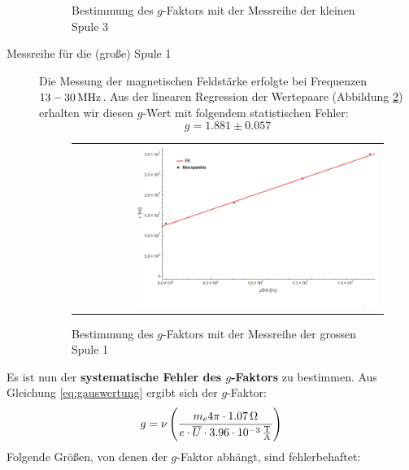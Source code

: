 \documentclass[a4paper,titlepage]{scrartcl}
\numberwithin{equation}{section}
\begin{document}
\begin{description}
\begin{figure}[H]
\begin{tabular}{@{}r@{}}
	\end{tabular}
	\caption{Bestimmung des $g$-Faktors mit der Messreihe der kleinen Spule 3}
    \label{fig:gkleine}
\end{figure}
\item[Messreihe für die (große) Spule 1] Die Messung der magnetischen Feldstärke erfolgte bei Frequenzen $\unit[13-30]{MHz}$. Aus der linearen Regression der Wertepaare (Abbildung \ref{fig:ggrosse}) erhalten wir diesen $g$-Wert mit folgendem statistischen Fehler:
\begin{equation*}
g=1.881 \pm 0.057
\end{equation*}
\begin{figure}[H]
	\centering
	\begin{tabular}{@{}r@{}}
		\includegraphics[width=0.8\textwidth]{ggrosse.png}\\
	\end{tabular}
	\caption{Bestimmung des $g$-Faktors mit der Messreihe der grossen Spule 1}
    \label{fig:ggrosse}
\end{figure}
\end{description}
Es ist nun der \textbf{systematische Fehler des $g$-Faktors} zu bestimmen. Aus Gleichung \ref{eq:gauswertung} ergibt sich der $g$-Faktor:
\begin{equation*}
g=\nu \left( \frac{m_e 4 \pi \cdot \unit[1.07]{\Omega}}{e \cdot \overline{U} \cdot \unit[3.96 \cdot 10^{-3}]{\frac{T}{A}}} \right)
\end{equation*}
Folgende Größen, von denen der $g$-Faktor abhängt, sind fehlerbehaftet:
\end{document}
